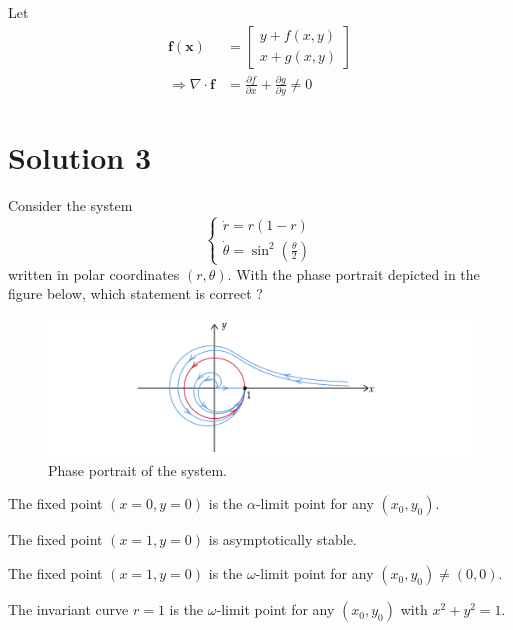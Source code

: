 \documentclass[twoside,10pt,a4paper]{article}
\begin{document}
{\color{MyRed}
Let
\begin{align*}
	\mathbf{f}(\mathbf{x}) &= \begin{bmatrix}
		y + f(x,y) \\
		x + g(x,y)
	\end{bmatrix} \\
	\Longrightarrow \nabla \cdot \mathbf{f} &=  \frac{\partial f}{\partial x} + \frac{\partial g}{\partial y} \neq 0
\end{align*}
}

\section*{Solution 3}
Consider the system
\begin{equation*}
	\begin{cases}
		\dot{r} = r(1 - r) \\
		\dot{\theta} = \sin^2 \left( \frac{\theta}{2} \right)
	\end{cases}
\end{equation*}
written in polar coordinates $(r, \theta)$. With the phase portrait depicted in the figure below, which statement is correct ?

\begin{figure}[H]
	\centering
	\includegraphics[scale=0.9]{Graphics/MCQ1_figures/Q16D01.pdf}
	\caption{Phase portrait of the system.}
\end{figure}

\begin{enumerate}[label=(\alph*)]
	\item The fixed point $(x = 0, y = 0)$ is the $\alpha$-limit point for any $(x_0, y_0)$.
	\item The fixed point $(x = 1, y = 0)$ is asymptotically stable.
	{\color{MyRed}\item The fixed point $(x = 1, y = 0)$ is the $\omega$-limit point for any $(x_0, y_0) \neq (0,0)$.}
	\item The invariant curve $r=1$ is the $\omega$-limit point for any $(x_0, y_0)$ with $x^2 + y^2 = 1$.
\end{enumerate}
\end{document}
